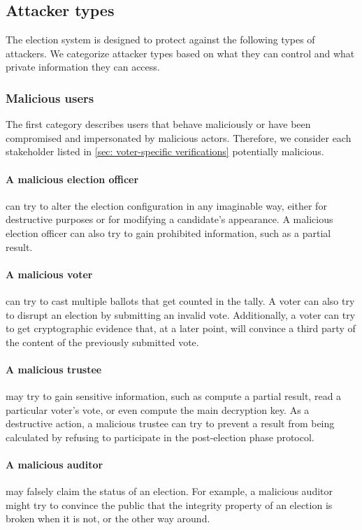 \subsection{Attacker types} \label{sec: attacker types}
The election system is designed to protect against the following types of attackers. We categorize attacker types based on what they can control and what private information they can access. 

\subsubsection{Malicious users} \label{sec: malicious users}
The first category describes users that behave maliciously or have been compromised and impersonated by malicious actors. Therefore, we consider each stakeholder listed in \cref{sec: voter-specific verifications} potentially malicious.

\paragraph{A malicious election officer} can try to alter the election configuration in any imaginable way, either for destructive purposes or for modifying a candidate's appearance. A malicious election officer can also try to gain prohibited information, such as a partial result. 

\paragraph{A malicious voter} can try to cast multiple ballots that get counted in the tally. A voter can also try to disrupt an election by submitting an invalid vote. Additionally, a voter can try to get cryptographic evidence that, at a later point, will convince a third party of the content of the previously submitted vote. 

\paragraph{A malicious trustee} may try to gain sensitive information, such as compute a partial result, read a particular voter's vote, or even compute the main decryption key. As a destructive action, a malicious trustee can try to prevent a result from being calculated by refusing to participate in the post-election phase protocol.

\paragraph{A malicious auditor} may falsely claim the status of an election. For example, a malicious auditor might try to convince the public that the integrity property of an election is broken when it is not, or the other way around.


